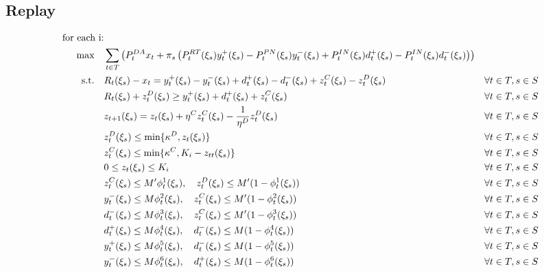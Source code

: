 \documentclass[10pt]{article}
\begin{document}
\subsection{Replay}
\begin{subequations}
    \begin{align} 
        \text{for each i:} \notag\\
        \text{max} \quad &\sum_{t\in T}\left(P_t^{DA} x_{t} + \pi_s\left(P_t^{RT}(\xi_s)  y^+_{t}(\xi_s) - P_t^{PN}(\xi_s) y^-_{t}(\xi_s) + P_{t}^{IN}(\xi_s) d^+_{t}(\xi_s) - P_{t}^{IN}(\xi_s) d^-_{t}(\xi_s) \right)\right)& \\
        \text{s.t.} \quad 
        & R_{t}(\xi_s) - x_{t} = y_{t}^{+}(\xi_s) - y_{t}^{-}(\xi_s) + d^+_{t}(\xi_s) - d^-_{t}(\xi_s) + z^C_{t}(\xi_s) - z^D_{t}(\xi_s) & \forall t \in T, s \in S\\
        & R_{t}(\xi_s) + z^D_{t}(\xi_s) \geq y^+_{t}(\xi_s) + d^+_{t}(\xi_s) + z^C_{t}(\xi_s) & \forall t \in T, s \in S\\
        & z_{t+1}(\xi_s) = z_{t}(\xi_s) + \eta^C z^C_{t}(\xi_s) - \frac{1}{\eta^D} z^D_{t}(\xi_s) & \forall t \in T, s \in S \\
        & z^D_{t}(\xi_s) \le \text{min} \{\kappa^D, z_{t}(\xi_s) \} & \forall t \in T, s \in S \\
        & z^C_{t}(\xi_s) \le \text{min} \{\kappa^C, K_i - z_{tt}(\xi_s) \} & \forall t \in T, s \in S \\
        & 0 \leq z_{t}(\xi_s) \leq K_i & \forall t \in T, s \in S \\
        & z^C_{t}(\xi_s) \leq M' \phi^1_{t}(\xi_s), \quad z^D_{t}(\xi_s) \leq M' (1 - \phi^1_{t}(\xi_s)) & \forall t \in T, s \in S \\
        & y^-_{t}(\xi_s) \leq M \phi^2_{t}(\xi_s), \quad z^C_{t}(\xi_s) \leq M' (1 - \phi^2_{t}(\xi_s)) & \forall t \in T, s \in S \\
        & d^-_{t}(\xi_s) \leq M \phi^3_{t}(\xi_s), \quad z^C_{t}(\xi_s) \leq M' (1 - \phi^3_{t}(\xi_s)) & \forall t \in T, s \in S \\
        & d^+_{t}(\xi_s) \leq M \phi^4_{t}(\xi_s), \quad d^-_{t}(\xi_s) \leq M (1 - \phi^4_{t}(\xi_s)) & \forall t \in T, s \in S \\
        & y^+_{t}(\xi_s) \leq M \phi^5_{t}(\xi_s), \quad d^-_{t}(\xi_s) \leq M (1 - \phi^5_{t}(\xi_s)) & \forall t \in T, s \in S \\
        & y^-_{t}(\xi_s) \leq M \phi^6_{t}(\xi_s), \quad d^+_{t}(\xi_s) \leq M (1 - \phi^6_{t}(\xi_s)) & \forall t \in T, s \in S
    \end{align}
\end{subequations}
\end{document}

